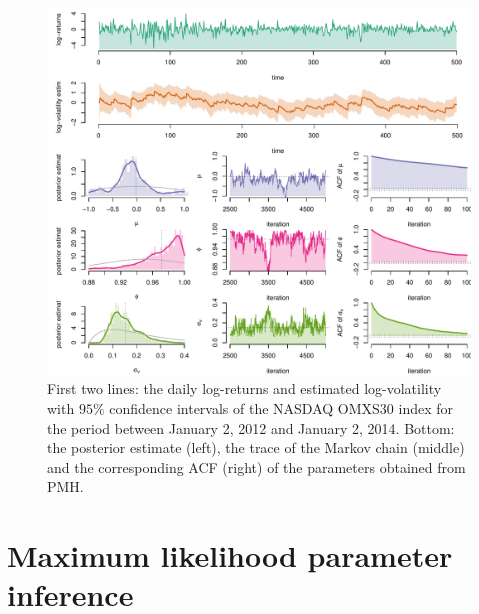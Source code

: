 \documentclass[mstat,12pt]{unswthesis}  %
\numberwithin{equation}{section}
\begin{document}
\begin{figure}[H]
    \centering
    \includegraphics[width=1.0\linewidth]{svpmh.pdf}
    \caption
    {First two lines: the daily log-returns and estimated log-volatility  with
    $95\%$ confidence intervals of the NASDAQ OMXS30 index for the period between January 2,
    2012 and January 2, 2014.
    Bottom: the posterior estimate (left), the trace of the Markov
    chain (middle) and the corresponding ACF (right) of the parameters obtained from PMH.}
    \label{fig:svpmh}
\end{figure}



\section{Maximum likelihood parameter inference}
\end{document}
